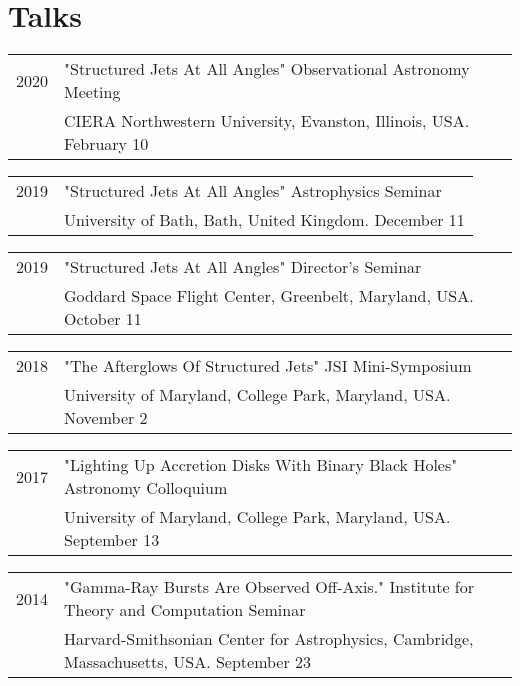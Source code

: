 \documentclass[letterpaper]{article}
\renewenvironment{itemize}{
  \begin{list}{}{
    \setlength{\leftmargin}{1.5em}
  }
}{
  \end{list}
}
\begin{document}
\section*{Talks}
\begin{itemize}
\item \begin{tabular}{ll}
2020 & "Structured Jets At All Angles" Observational Astronomy Meeting  \\
	& CIERA Northwestern University, Evanston, Illinois, USA.  February 10
\end{tabular}
\item \begin{tabular}{ll}
2019 & "Structured Jets At All Angles" Astrophysics Seminar  \\
	& University of Bath, Bath, United Kingdom.  December 11
\end{tabular}
\item \begin{tabular}{ll}
2019 & "Structured Jets At All Angles" Director's Seminar  \\
	& Goddard Space Flight Center, Greenbelt, Maryland, USA.  October 11
\end{tabular}

\item \begin{tabular}{ll}
2018 & "The Afterglows Of Structured Jets" JSI Mini-Symposium  \\
	& University of Maryland, College Park, Maryland, USA.  November 2
\end{tabular}

\item \begin{tabular}{ll}
2017 & "Lighting Up Accretion Disks With Binary Black Holes" Astronomy Colloquium  \\
	& University of Maryland, College Park, Maryland, USA.  September 13
\end{tabular}

\item \begin{tabular}{ll}
2014 & "Gamma-Ray Bursts Are Observed Off-Axis." Institute for Theory and Computation Seminar  \\
	& Harvard-Smithsonian Center for Astrophysics, Cambridge, Massachusetts, USA.  September 23
\end{tabular}
\end{itemize}

\end{document}
